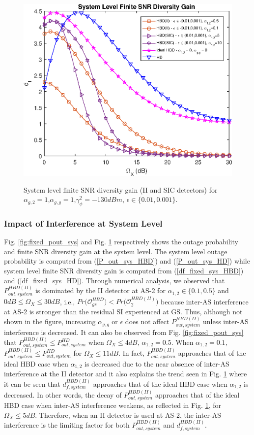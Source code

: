\begin{figure}[]
\centering
\includegraphics [width=0.6\columnwidth]{chap4_fig/fixed_df_sys.eps}
\label{fig:fixed_df_sys}
\caption{System level finite SNR diversity gain (II and SIC detectors) for $\alpha_{g,2}=1$,$\alpha_{g,g}=1$,$\gamma_{\phi}^2=-130dBm$, $\epsilon\in\{0.01, 0.001\}$.}
\end{figure}

\subsubsection{Impact of Interference at System Level}
Fig. \ref{fig:fixed_pout_sys} and Fig. \ref{fig:fixed_df_sys} respectively shows the outage probability and finite SNR diversity gain at the system level. The system level outage probability is computed from (\ref{P_out_sys_HBD}) and (\ref{P_out_sys_HD}) while system level finite SNR diversity gain is computed from (\ref{df_fixed_sys_HBD}) and (\ref{df_fixed_sys_HD}). Through numerical analysis, we observed that $P_{out,system}^{HBD(II)}$ is dominated by the II detector at AS-2 for $\alpha_{1,2} \in \{0.1, 0.5\}$ and $0dB \leq \Omega_X \leq 30dB$, i.e., $Pr\big(\mathcal{O}_{gs}^{HBD}\big)<Pr\big(\mathcal{O}_{2}^{HBD(II)}\big)$ because inter-AS interference at AS-2 is stronger than the residual SI experienced at GS. Thus, although not shown in the figure, increasing $\alpha_{g,g}$ or $\epsilon$ does not affect $P_{out,system}^{HBD(II)}$ unless inter-AS interference is decreased. It can also be observed from Fig. \ref{fig:fixed_pout_sys} that $P_{out,system}^{HBD(II)} \leq P_{out,system}^{HD}$ when $\Omega_X\leq4dB$, $\alpha_{1,2}=0.5$. When $\alpha_{1,2}=0.1$, $P_{out,system}^{HBD(II)} \leq P_{out,system}^{HD}$ for $\Omega_X\leq11dB$. In fact, $P_{out,system}^{HBD(II)}$ approaches that of the ideal HBD case when $\alpha_{1,2}$ is decreased due to the near absence of inter-AS interference at the II detector and it also explains the trend seen in Fig. \ref{fig:fixed_df_sys} where it can be seen that $d_{f,system}^{HBD(II)}$ approaches that of the ideal HBD case when $\alpha_{1,2}$ is decreased. In other words, the decay of $P_{out,system}^{HBD(II)}$ approaches that of the ideal HBD case when inter-AS interference weakens, as reflected in Fig. \ref{fig:fixed_df_sys}, for $\Omega_X \leq 5dB$. Therefore, when an II detector is used at AS-2, the inter-AS interference is the limiting factor for both $P_{out,system}^{HBD(II)}$ and $d_{f,system}^{HBD(II)}$.

